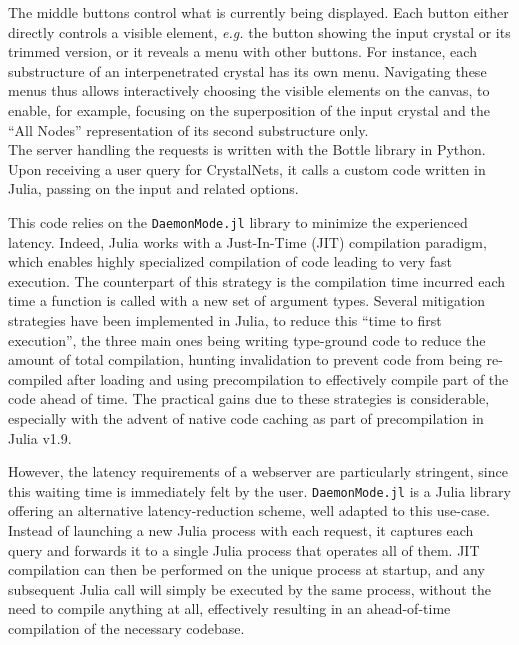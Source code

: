 \documentclass[main.tex]{subfiles}
\begin{document}
The middle buttons control what is currently being displayed. Each button either directly controls a visible element, \textit{e.g.} the button showing the input crystal or its trimmed version, or it reveals a menu with other buttons. For instance, each substructure of an interpenetrated crystal has its own menu. Navigating these menus thus allows interactively choosing the visible elements on the canvas, to enable, for example, focusing on the superposition of the input crystal and the ``All Nodes'' representation of its second substructure only.\\


The server handling the requests is written with the Bottle library in Python. Upon receiving a user query for CrystalNets, it calls a custom code written in Julia, passing on the input and related options.

This code relies on the \texttt{DaemonMode.jl} library to minimize the experienced latency. Indeed, Julia works with a Just-In-Time (JIT) compilation paradigm, which enables highly specialized compilation of code leading to very fast execution. The counterpart of this strategy is the compilation time incurred each time a function is called with a new set of argument types. Several mitigation strategies have been implemented in Julia, to reduce this ``time to first execution'', the three main ones being writing type-ground code to reduce the amount of total compilation, hunting invalidation to prevent code from being re-compiled after loading and using precompilation to effectively compile part of the code ahead of time. The practical gains due to these strategies is considerable, especially with the advent of native code caching as part of precompilation in Julia v1.9.

However, the latency requirements of a webserver are particularly stringent, since this waiting time is immediately felt by the user. \texttt{DaemonMode.jl} is a Julia library offering an alternative latency-reduction scheme, well adapted to this use-case. Instead of launching a new Julia process with each request, it captures each query and forwards it to a single Julia process that operates all of them. JIT compilation can then be performed on the unique process at startup, and any subsequent Julia call will simply be executed by the same process, without the need to compile anything at all, effectively resulting in an ahead-of-time compilation of the necessary codebase.
\end{document}

